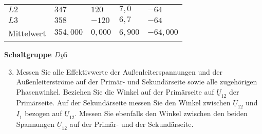 \begin{enumerate}[label=\alph*)]
\begin{table}[h!]
\begin{tabular}{lllll}
            $L2$       & $347$                    & $120$                       & $7,0$                    & $-64$                       \\
            $L3$       & $358$                    & $-120$                      & $6,7$                    & $-64$                       \\ \hline
            Mittelwert & $354,000$                & $0,000$                     & $6,900$                  & $-64,000$                   \\ \hline\hline
          \end{tabular}
        \end{table}

\end{enumerate}
\textbf{Schaltgruppe $Dy5$}
\begin{enumerate}[label=\alph*)]
  \setcounter{enumi}{2}
  \item Messen Sie alle Effektivwerte der Außenleiterspannungen und der
        Außenleiterströme auf der Primär- und Sekundärseite sowie alle zugehörigen
        Phasenwinkel. Beziehen Sie die Winkel auf der Primärseite auf $\underline
          U_{12}$ der Primärseite. Auf der Sekundärseite messen Sie den Winkel zwischen
        $\underline U_{12}$ und $\underline I_1$ bezogen auf $\underline U_{12}$.
        Messen Sie ebenfalls den Winkel zwischen den beiden Spannungen $\underline
          U_{12}$ auf der Primär- und der Sekundärseite.


\end{enumerate}
